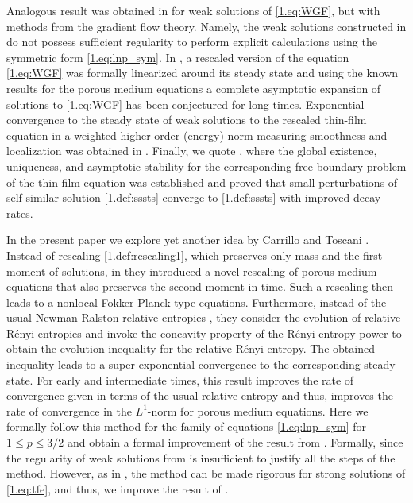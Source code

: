 \documentclass[12pt]{amsart}
\theoremstyle{plain}
\theoremstyle{definition}
\theoremstyle{remark}
\begin{document}
Analogous result was obtained in \cite{MMS09} for weak solutions of \eqref{1.eq:WGF}, but with methods from the gradient flow theory. Namely, the weak solutions constructed in \cite{MMS09} do not possess sufficient regularity to perform explicit calculations using the symmetric form \eqref{1.eq:lnp_sym}.
In \cite{McSe15}, a rescaled version of the equation \eqref{1.eq:WGF} was formally linearized around its steady state and using the known results for the porous medium equations a complete asymptotic expansion of solutions to \eqref{1.eq:WGF} has been conjectured for long times. 
Exponential convergence to the steady state of weak solutions to the rescaled thin-film equation in a weighted higher-order (energy) norm measuring smoothness and localization was obtained in \cite{CaUl14}. Finally, we quote \cite{Gna15}, where the global existence, uniqueness, and asymptotic stability for the corresponding free boundary problem of the thin-film equation was established and proved that small perturbations of self-similar solution \eqref{1.def:sssts} converge to \eqref{1.def:sssts} with improved decay rates.

In the present paper we explore yet another idea by Carrillo and Toscani \cite{CaTo14}. Instead of rescaling \eqref{1.def:rescaling1}, which preserves only mass and the first moment of solutions, in \cite{CaTo14} they introduced a novel rescaling of porous medium equations that also preserves the second moment in time. Such a rescaling then leads to a nonlocal Fokker-Planck-type equations. Furthermore, instead of the usual Newman-Ralston relative entropies \cite{New84}, they consider the evolution of relative R\'enyi entropies and invoke the concavity property of the R\'enyi entropy power \cite{SaTo14} to obtain the evolution inequality for the relative R\'enyi entropy. The obtained inequality leads to a super-exponential convergence to the corresponding steady state. For early and intermediate times, this result improves the rate of convergence given in terms of the usual relative entropy and thus, improves the rate of convergence in the $L^1$-norm for porous medium equations. 
Here we formally follow this method for the family of equations \eqref{1.eq:lnp_sym} for $1\leq p \leq 3/2$ and obtain a formal improvement of the result from \cite{MMS09}. Formally, since the regularity of weak solutions from \cite{MMS09} is insufficient to justify all the steps of the method. However, as in \cite{CaTo02}, the method can be made rigorous for strong solutions of \eqref{1.eq:tfe}, and thus, we improve the result of \cite{CaTo02}.
\end{document}
